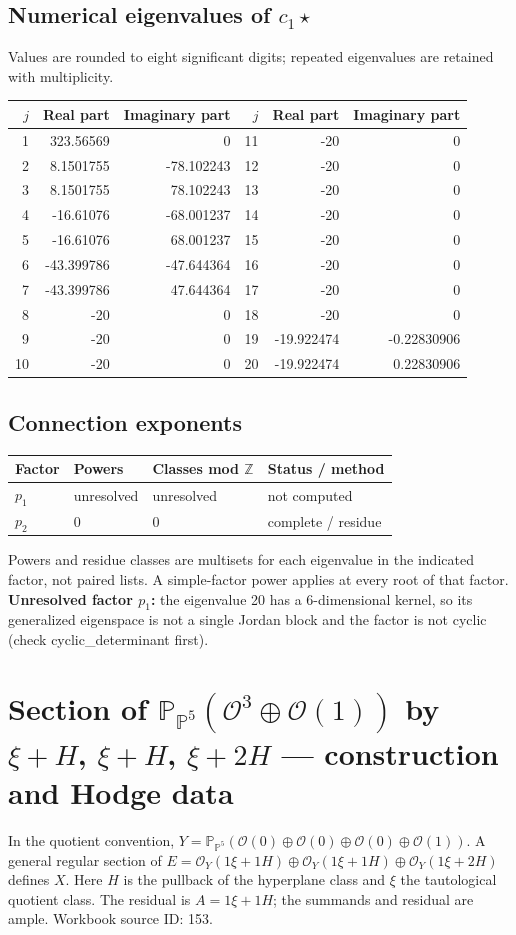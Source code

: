 \documentclass[10pt,a4paper]{article}
\begin{document}
\subsection*{Numerical eigenvalues of $c_1\star$}
Values are rounded to eight significant digits; repeated eigenvalues are retained with multiplicity.
\begin{center}\small\begin{tabular}{rrr@{\qquad}rrr}\toprule $j$ & Real part & Imaginary part & $j$ & Real part & Imaginary part\\\midrule
1 & 323.56569 & 0 & 11 & -20 & 0\\
2 & 8.1501755 & -78.102243 & 12 & -20 & 0\\
3 & 8.1501755 & 78.102243 & 13 & -20 & 0\\
4 & -16.61076 & -68.001237 & 14 & -20 & 0\\
5 & -16.61076 & 68.001237 & 15 & -20 & 0\\
6 & -43.399786 & -47.644364 & 16 & -20 & 0\\
7 & -43.399786 & 47.644364 & 17 & -20 & 0\\
8 & -20 & 0 & 18 & -20 & 0\\
9 & -20 & 0 & 19 & -19.922474 & -0.22830906\\
10 & -20 & 0 & 20 & -19.922474 & 0.22830906\\
\bottomrule\end{tabular}\end{center}
\subsection*{Connection exponents}
\begin{center}\begin{tabular}{llll}\toprule Factor & Powers & Classes mod $\mathbb Z$ & Status / method\\\midrule
$p_{1}$ & unresolved & unresolved & not computed\\
$p_{2}$ & $0$ & $0$ & complete / residue\\
\bottomrule\end{tabular}\end{center}
Powers and residue classes are multisets for each eigenvalue in the indicated factor, not paired lists. A simple-factor power applies at every root of that factor.
\textbf{Unresolved factor $p_{1}$:} the eigenvalue 20 has a 6-dimensional kernel, so its generalized eigenspace is not a single Jordan block and the factor is not cyclic (check cyclic\_determinant first).
\clearpage\section*{Section of $\mathbb P_{\mathbb P^{5}}(\mathcal O^{3}\oplus \mathcal O(1))$ by $\xi +H$, $\xi +H$, $\xi +2H$ --- construction and Hodge data}\label{entry:PB5-153}
In the quotient convention, $Y=\mathbb P_{\mathbb P^{5}}(\mathcal O(0)\oplus\mathcal O(0)\oplus\mathcal O(0)\oplus\mathcal O(1))$.
A general regular section of $E=\mathcal O_Y(1\xi+1H)\oplus\mathcal O_Y(1\xi+1H)\oplus\mathcal O_Y(1\xi+2H)$ defines $X$.
Here $H$ is the pullback of the hyperplane class and $\xi$ the tautological quotient class. The residual is $A=1\xi+1H$; the summands and residual are ample.
Workbook source ID: 153.
\end{document}
